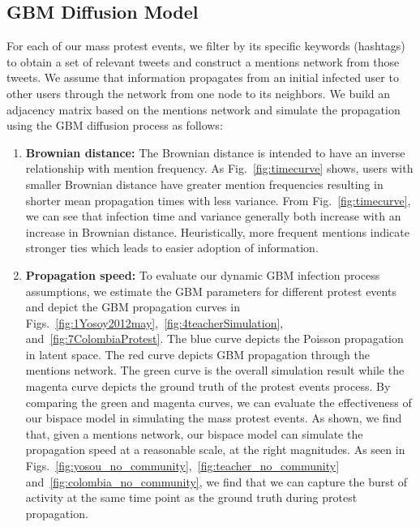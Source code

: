 \subsection{GBM Diffusion Model}
For each of our mass protest events, we filter by its specific keywords (hashtags) to obtain a set of relevant tweets and construct a mentions network from those tweets. We assume that information propagates from an initial infected user to other users through the network from one node to its neighbors. We build an adjacency matrix based on the mentions network and simulate the propagation using the GBM diffusion process as follows:
\begin{enumerate}
  \item \textbf{Brownian distance:} The Brownian distance is intended to have
an inverse relationship with mention frequency. As Fig.~\ref{fig:timecurve} shows, users with smaller Brownian distance have greater mention frequencies resulting in shorter mean propagation times with less variance. From Fig.~\ref{fig:timecurve}, we can see that infection time and variance generally both increase with an increase in Brownian distance. Heuristically, more frequent mentions indicate stronger ties which leads to easier adoption of information.

  \item \textbf{Propagation speed: } To evaluate our dynamic GBM
infection process assumptions, we estimate the GBM parameters for different protest events and depict the GBM propagation curves in Figs.~\ref{fig:1Yosoy2012may},~\ref{fig:4teacherSimulation}, and~\ref{fig:7ColombiaProtest}. The blue curve depicts the Poisson propagation in latent space. The red curve depicts GBM propagation through the mentions network. The green curve is the overall simulation result while the magenta curve depicts the ground truth of the protest events process. By comparing the green and magenta curves, we can evaluate the
effectiveness of our bispace model in simulating the mass protest events.
As shown, we find that, given a mentions network, our bispace model can simulate the propagation speed at a reasonable scale, at the right magnitudes. As seen in Figs.~\ref{fig:yosou_no_community},~\ref{fig:teacher_no_community} and~\ref{fig:colombia_no_community},
we find that we can capture the burst of activity at the same time point as the ground truth during protest propagation.


\end{enumerate}



